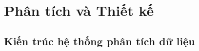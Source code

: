 \documentclass{beamer}
\begin{document}

\section{Phân tích và Thiết kế}
\subsection{Kiến trúc hệ thống phân tích dữ liệu}
\end{document}
